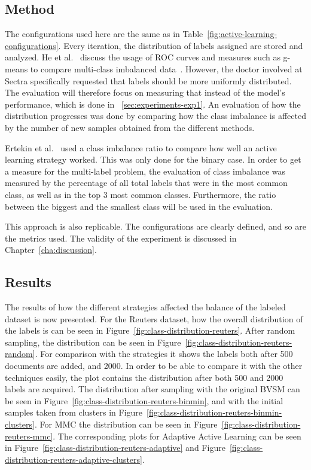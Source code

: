 \subsection{Method}

The configurations used here are the same as in Table~\ref{fig:active-learning-configurations}.
Every iteration, the distribution of labels assigned are stored and analyzed.
He et al\@.~\cite{he2009learning} discuss the usage of ROC curves and measures such as g-means to compare multi-class imbalanced data~\cite{he2009learning}.
However, the doctor involved at Sectra specifically requested that labels should be more uniformly distributed. 
The evaluation will therefore focus on measuring that instead of the model's performance, which is done in ~\ref{sec:experiments-exp1}.
An evaluation of how the distribution progresses was done by comparing how the class imbalance is affected by the number of new samples obtained from the different methods.

Ertekin et al\@.~\cite{ertekin2007learning} used a class imbalance ratio to compare how well an active learning strategy worked.
This was only done for the binary case.
In order to get a measure for the multi-label problem, the evaluation of class imbalance was measured by the percentage of all total labels that were in the most common class, as well as in the top 3 most common classes.
Furthermore, the ratio between the biggest and the smallest class will be used in the evaluation.

This approach is also replicable.
The configurations are clearly defined, and so are the metrics used.
The validity of the experiment is discussed in Chapter~\ref{cha:discussion}.

\subsection{Results}

The results of how the different strategies affected the balance of the labeled dataset is now presented.
For the Reuters dataset, how the overall distribution of the labels is can be seen in Figure~\ref{fig:class-distribution-reuters}.
After random sampling, the distribution can be seen in Figure~\ref{fig:class-distribution-reuters-random}.
For comparison with the strategies it shows the labels both after 500 documents are added, and 2000.
In order to be able to compare it with the other techniques easily, the plot contains the distribution after both 500 and 2000 labels are acquired.
The distribution after sampling with the original BVSM can be seen in Figure~\ref{fig:class-distribution-reuters-binmin}, and with the initial samples taken from clusters in Figure~\ref{fig:class-distribution-reuters-binmin-clusters}.
For MMC the distribution can be seen in Figure~\ref{fig:class-distribution-reuters-mmc}.
The corresponding plots for Adaptive Active Learning can be seen in Figure~\ref{fig:class-distribution-reuters-adaptive} and Figure~\ref{fig:class-distribution-reuters-adaptive-clusters}.

